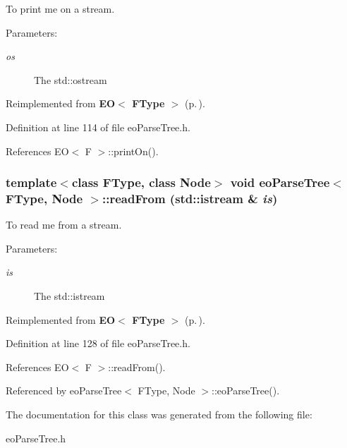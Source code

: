 To print me on a stream. 

\begin{Desc}
\item[Parameters:]
\begin{description}
\item[{\em os}]The std::ostream \end{description}
\end{Desc}


Reimplemented from {\bf EO$<$ FType $>$} {\rm (p.\,\pageref{class_e_o_z10_2})}.

Definition at line 114 of file eo\-Parse\-Tree.h.

References EO$<$ F $>$::print\-On().
\subsubsection{\setlength{\rightskip}{0pt plus 5cm}template$<$class FType, class Node$>$ void {\bf eo\-Parse\-Tree}$<$ FType, Node $>$::read\-From (std::istream \& {\em is})\hspace{0.3cm}{\tt  [inline, virtual]}}\label{classeo_parse_tree_a6}


To read me from a stream. 

\begin{Desc}
\item[Parameters:]
\begin{description}
\item[{\em is}]The std::istream \end{description}
\end{Desc}


Reimplemented from {\bf EO$<$ FType $>$} {\rm (p.\,\pageref{class_e_o_z10_1})}.

Definition at line 128 of file eo\-Parse\-Tree.h.

References EO$<$ F $>$::read\-From().

Referenced by eo\-Parse\-Tree$<$ FType, Node $>$::eo\-Parse\-Tree().

The documentation for this class was generated from the following file:\begin{CompactItemize}
\item 
eo\-Parse\-Tree.h\end{CompactItemize}
